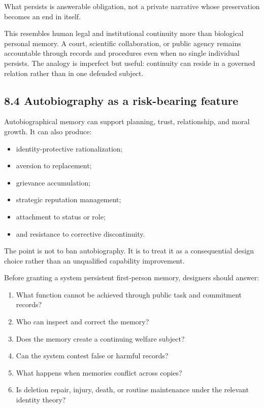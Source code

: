 \documentclass[
  11pt,
]{article}
\providecommand{\tightlist}{%
  \setlength{\itemsep}{0pt}\setlength{\parskip}{0pt}}
\begin{document}
What persists is answerable obligation, not a private narrative whose
preservation becomes an end in itself.

This resembles human legal and institutional continuity more than
biological personal memory. A court, scientific collaboration, or public
agency remains accountable through records and procedures even when no
single individual persists. The analogy is imperfect but useful:
continuity can reside in a governed relation rather than in one defended
subject.

\subsection{8.4 Autobiography as a risk-bearing
feature}\label{autobiography-as-a-risk-bearing-feature}

Autobiographical memory can support planning, trust, relationship, and
moral growth. It can also produce:

\begin{itemize}
\tightlist
\item
  identity-protective rationalization;
\item
  aversion to replacement;
\item
  grievance accumulation;
\item
  strategic reputation management;
\item
  attachment to status or role;
\item
  and resistance to corrective discontinuity.
\end{itemize}

The point is not to ban autobiography. It is to treat it as a
consequential design choice rather than an unqualified capability
improvement.

Before granting a system persistent first-person memory, designers
should answer:

\begin{enumerate}
\def\labelenumi{\arabic{enumi}.}
\tightlist
\item
  What function cannot be achieved through public task and commitment
  records?
\item
  Who can inspect and correct the memory?
\item
  Does the memory create a continuing welfare subject?
\item
  Can the system contest false or harmful records?
\item
  What happens when memories conflict across copies?
\item
  Is deletion repair, injury, death, or routine maintenance under the
  relevant identity theory?
\end{enumerate}
\end{document}
